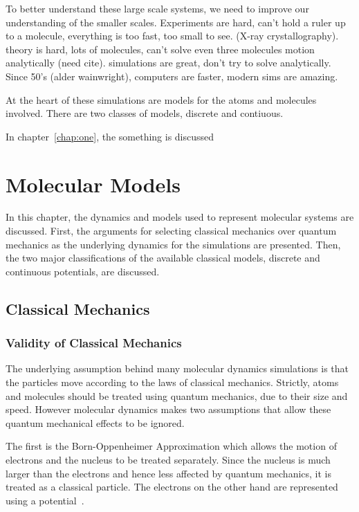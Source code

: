 \documentclass[12pt]{UoAthesis}
\begin{document}

To better understand these large scale systems, we need to improve our
understanding of the smaller scales. Experiments are hard, can't hold
a ruler up to a molecule, everything is too fast, too small to
see. (X-ray crystallography). theory is hard, lots of molecules, can't
solve even three molecules motion analytically (need
cite). simulations are great, don't try to solve analytically. Since
50's (alder wainwright), computers are faster, modern sims are
amazing.

At the heart of these simulations are models for the atoms and
molecules involved. There are two classes of models, discrete and
contiuous.

In chapter~\ref{chap:one}, the something is discussed

\chapter{Molecular Models}
In this chapter, the dynamics and models used to represent molecular
systems are discussed. First, the arguments for selecting classical
mechanics over quantum mechanics as the underlying dynamics for the
simulations are presented.  Then, the two major classifications of the
available classical models, discrete and continuous potentials, are
discussed.

\section{Classical Mechanics}

\subsection{Validity of Classical Mechanics}

The underlying assumption behind many molecular dynamics simulations
is that the particles move according to the laws of classical
mechanics. Strictly, atoms and molecules should be treated using
quantum mechanics, due to their size and speed.  However molecular
dynamics makes two assumptions that allow these quantum mechanical
effects to be ignored.

The first is the Born-Oppenheimer Approximation which allows the
motion of electrons and the nucleus to be treated separately.  Since
the nucleus is much larger than the electrons and hence less affected
by quantum mechanics, it is treated as a classical particle.  The
electrons on the other hand are represented using a
potential~\cite{Jasper2006}.
\end{document}
